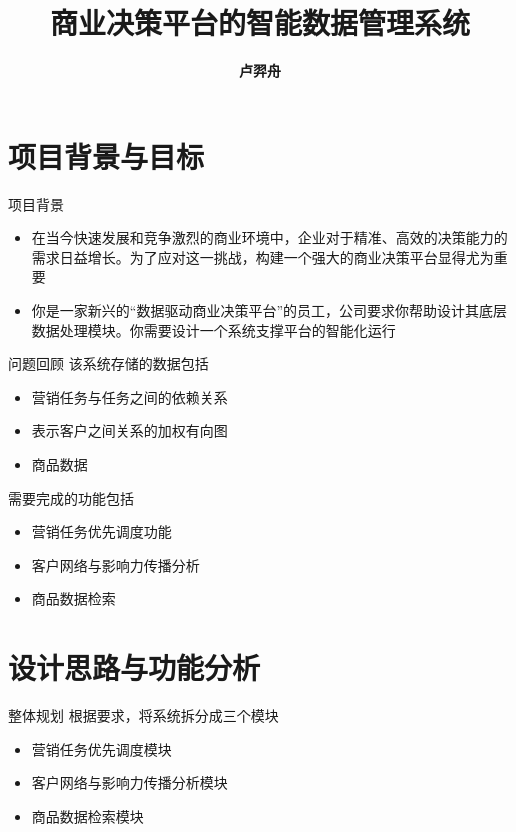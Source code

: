 \documentclass[aspectratio=169]{beamer}
\title[数据结构与算法导论]{商业决策平台的智能数据管理系统}
\author[卢羿舟]{\textbf{卢羿舟}}
\institute[复旦大学]{
    统计与数据科学系
}
\begin{document}
\begin{frame}
  \titlepage
\end{frame}

\section{项目背景与目标}

\begin{frame}{项目背景}
    \begin{itemize}
        \item 在当今快速发展和竞争激烈的商业环境中，企业对于精准、高效的决策能力的需求日益增长。为了应对这一挑战，构建一个强大的商业决策平台显得尤为重要
        \item 你是一家新兴的“数据驱动商业决策平台”的员工，公司要求你帮助设计其底层数据处理模块。你需要设计一个系统支撑平台的智能化运行
    \end{itemize}
\end{frame}

\begin{frame}{问题回顾}
    该系统存储的数据包括
    \begin{itemize}
        \item 营销任务与任务之间的依赖关系
        \item 表示客户之间关系的加权有向图
        \item 商品数据
    \end{itemize}
    需要完成的功能包括
    \begin{itemize}
        \item 营销任务优先调度功能
        \item 客户网络与影响力传播分析
        \item 商品数据检索
    \end{itemize}
\end{frame}


\section{设计思路与功能分析}

\begin{frame}{整体规划}
    根据要求，将系统拆分成三个模块
    \begin{itemize}
        \item 营销任务优先调度模块
        \item 客户网络与影响力传播分析模块
        \item 商品数据检索模块
    \end{itemize}
\end{frame}
\end{document}
